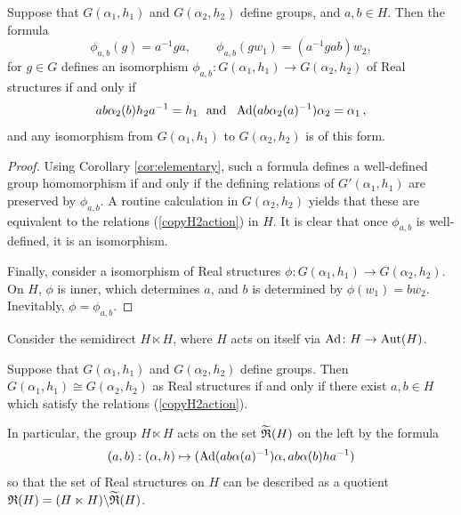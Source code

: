 \begin{lemma}\label{lem:modifiedelementary2}
  Suppose that $G(\alpha_1, h_1)$ and $G(\alpha_2, h_2)$ define groups, and $a, b \in H$. Then the formula
  \[
  \phi_{a,b}(g) = a^{-1} g a, \qquad \phi_{a,b}(g w_1) = (a^{-1} g a b) w_2,
  \]
  for $g \in G$ defines an isomorphism $\phi_{a,b} \colon G(\alpha_1, h_1) \rightarrow G(\alpha_2, h_2)$ of Real structures if and only if
  \begin{equation}\label{copyH2action}
  a b  \alpha_2(b) h_2 a^{-1} = h_1
  \ \mbox{ and } \ 
    \Ad(a b  \alpha_2(a)^{-1}) \alpha_2 = \alpha_1 \, ,
\end{equation}
and any isomorphism from $G(\alpha_1, h_1)$ to $G(\alpha_2, h_2)$ is of this form.
\end{lemma}
\begin{proof}
  Using Corollary \ref{cor:elementary}, such a formula defines a well-defined group homomorphism if and only if the defining relations of $G'(\alpha_1, h_1)$ are preserved by $\phi_{a,b}$. A routine calculation in $G(\alpha_2, h_2)$ yields that these are equivalent to the relations (\ref{copyH2action}) in $H$. It is clear that once $\phi_{a,b}$ is well-defined, it is an isomorphism.

  Finally, consider a isomorphism of Real structures $\phi: G(\alpha_1, h_1) \to G(\alpha_2, h_2)$.
  On $H$, $\phi$ is inner, which determines $a$, and $b$ is determined by $\phi (w_1) = bw_2$.
  Inevitably, $\phi = \phi_{a,b}$.
\end{proof}

Consider the semidirect $H \ltimes H$, where $H$ acts on itself via $\operatorname{Ad} \colon H \rightarrow \operatorname{Aut}(H)$.

\begin{cor}\label{cor:HHaction}
Suppose that $G(\alpha_1, h_1)$ and $G(\alpha_2, h_2)$ define groups. Then $G(\alpha_1, h_1) \cong G(\alpha_2, h_2)$ as Real structures if and only if there exist $a,b \in H$ which satisfy the relations (\ref{copyH2action}).

In particular, the group $H \ltimes H$ acts on the set $\widetilde{{\mathfrak R}}(H)$ on the left by the formula 
  \begin{equation}\label{copyHHaction_explicit}
     (a,b) : (\alpha , h ) \mapsto
    (\operatorname{Ad}(a b  \alpha(a)^{-1}) \alpha,  a b  \alpha(b) h a^{-1}) 
  \end{equation}
  so that the set of Real structures on $H$ can be described as a quotient
  ${\mathfrak R}(H) = (H \ltimes H) \backslash \widetilde{{\mathfrak R}}(H)$. 
\end{cor}

